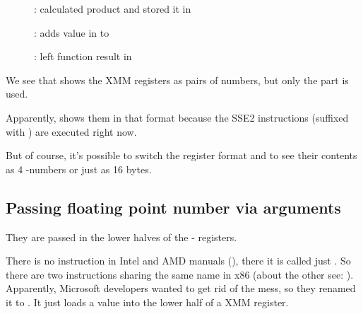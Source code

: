 \clearpage
\begin{figure}[H]
\centering
{}
\caption{\olly:  calculated \gls{product} and stored it
in }
\label{fig:FPU_SIMD_simple_olly3}
\end{figure}

\clearpage
\begin{figure}[H]
\centering
{}
\caption{\olly:  adds value in  to }
\label{fig:FPU_SIMD_simple_olly4}
\end{figure}

\clearpage
\begin{figure}[H]
\centering
{}
\caption{\olly: \FLD left function result in }
\label{fig:FPU_SIMD_simple_olly5}
\end{figure}

We see that \olly shows the XMM registers as pairs of \Tdouble numbers,
but only the  part is used.

Apparently, \olly shows them in that format because the SSE2 instructions (suffixed with ) 
are executed right now.

But of course, it's possible to switch the register format and to see their contents as
4 \Tfloat{}-numbers or just as 16 bytes.

\clearpage
\subsection{Passing floating point number via arguments}



They are passed in the lower halves
of the - registers.



There is no  instruction in Intel and AMD  manuals (), there it is called just .
So there are two instructions sharing the same name in x86 (about the other see: ).
Apparently, Microsoft developers wanted to get rid of the mess, so they renamed it to .
It just loads a value into the lower half of a XMM register.

